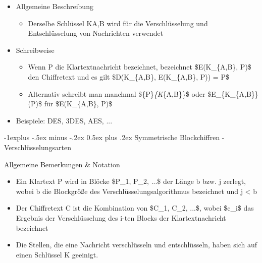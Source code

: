\documentclass[a4paper]{article}
\makeatletter
\renewcommand{\subsection}{\@startsection{subsection}{2}{0mm}%
 {-1explus -.5ex minus -.2ex}%
 {0.5ex plus .2ex}%
 {\normalfont\normalsize\bfseries}}
\makeatother
\begin{document}
\begin{multicols}{3}
    \begin{itemize}
        \item
              Allgemeine Beschreibung

              \begin{itemize}
                  \item
                        Derselbe Schlüssel KA,B wird für die Verschlüsselung und
                        Entschlüsselung von Nachrichten verwendet
              \end{itemize}
        \item
              Schreibweise

              \begin{itemize}
                  \item
                        Wenn P die Klartextnachricht bezeichnet, bezeichnet \$E(K\_\{A,B\},
                        P)\$ den Chiffretext und es gilt \$D(K\_\{A,B\}, E(K\_\{A,B\}, P)) =
                        P\$
                  \item
                        Alternativ schreibt man manchmal \$\{P\}\emph{\{K}\{A,B\}\}\$ oder
                        \$E\_\{K\_\{A,B\}\}(P)\$ für \$E(K\_\{A,B\}, P)\$
              \end{itemize}
        \item
              Beispiele: DES, 3DES, AES, ...
    \end{itemize}


    \subsection{Symmetrische Blockchiffren -
        Verschlüsselungsarten}

    Allgemeine Bemerkungen \& Notation

    \begin{itemize}
        \item
              Ein Klartext P wird in Blöcke \$P\_1, P\_2, ...\$ der Länge b bzw. j
              zerlegt, wobei b die Blockgröße des Verschlüsselungsalgorithmus
              bezeichnet und j \textless{} b
        \item
              Der Chiffretext C ist die Kombination von \$C\_1, C\_2, ...\$, wobei
              \$c\_i\$ das Ergebnis der Verschlüsselung des i-ten Blocks der
              Klartextnachricht bezeichnet
        \item
              Die Stellen, die eine Nachricht verschlüsseln und entschlüsseln, haben
              sich auf einen Schlüssel K geeinigt.
    \end{itemize}


\end{multicols}
\end{document}
